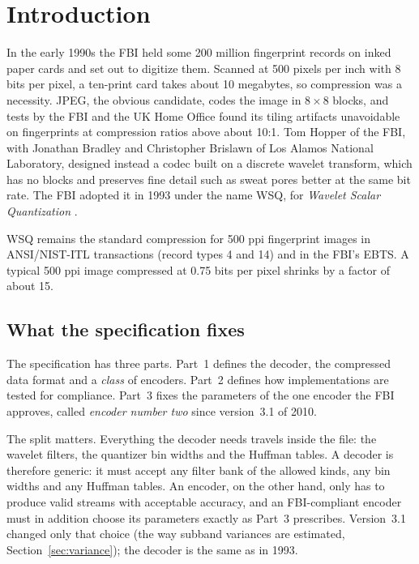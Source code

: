 \section{Introduction}
\label{sec:introduction}

In the early 1990s the FBI held some 200 million fingerprint records on inked paper cards and
set out to digitize them. Scanned at 500 pixels per inch with 8 bits per pixel, a ten-print card
takes about 10 megabytes, so compression was a necessity. JPEG, the obvious candidate, codes the
image in $8\times 8$ blocks, and tests by the FBI and the UK Home Office found its tiling
artifacts unavoidable on fingerprints at compression ratios above about 10:1. Tom Hopper of the
FBI, with Jonathan Bradley and Christopher Brislawn of Los Alamos National Laboratory, designed
instead a codec built on a discrete wavelet transform, which has no blocks and preserves fine
detail such as sweat pores better at the same bit rate. The FBI adopted it in 1993 under the
name WSQ, for \emph{Wavelet Scalar Quantization} \cite{brislawn1995,bradley1994}.

WSQ remains the standard compression for 500 ppi fingerprint images in ANSI/NIST-ITL
transactions (record types 4 and 14) and in the FBI's EBTS. A typical 500 ppi image compressed at
0.75 bits per pixel shrinks by a factor of about 15.

\subsection{What the specification fixes}

The specification \cite{wsq31} has three parts. Part~1 defines the decoder, the compressed
data format and a \emph{class} of encoders. Part~2 defines how implementations are tested for
compliance. Part~3 fixes the parameters of the one encoder the FBI approves, called
\emph{encoder number two} since version~3.1 of 2010.

The split matters. Everything the decoder needs travels inside the file: the wavelet filters,
the quantizer bin widths and the Huffman tables. A decoder is therefore generic: it must accept
any filter bank of the allowed kinds, any bin widths and any Huffman tables. An encoder, on the
other hand, only has to produce valid streams with acceptable accuracy, and an FBI-compliant
encoder must in addition choose its parameters exactly as Part~3 prescribes. Version~3.1 changed
only that choice (the way subband variances are estimated, Section~\ref{sec:variance}); the
decoder is the same as in 1993.

